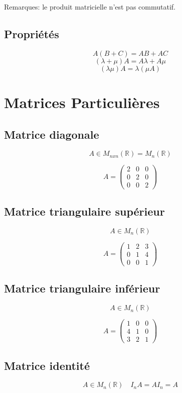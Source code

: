 \documentclass{article}
\begin{document}
Remarques: le produit matricielle n'est pas commutatif.

\subsection{Propriétés}
\[A( B + C ) = AB + AC\]
\[(\lambda + \mu) A = A \lambda + A \mu\]
\[(\lambda \mu) A = \lambda (\mu A)\]

\section{Matrices Particulières}
\subsection{Matrice diagonale}
\[A \in M_{nxn}(\mathbb{R}) = M_{n}(\mathbb{R})\]

\[
A=
  \begin{pmatrix}
    2 & 0 & 0 \\
    0 & 2 & 0 \\
    0 & 0 & 2
  \end{pmatrix}
\]

\subsection{Matrice triangulaire supérieur}
\[A \in M_{n}(\mathbb{R})\]

\[
A=
  \begin{pmatrix}
    1 & 2 & 3 \\
    0 & 1 & 4 \\
    0 & 0 & 1
  \end{pmatrix}
\]

\subsection{Matrice triangulaire inférieur}
\[A \in M_{n}(\mathbb{R})\]

\[
A=
  \begin{pmatrix}
    1 & 0 & 0 \\
    4 & 1 & 0 \\
    3 & 2 & 1
  \end{pmatrix}
\]

\subsection{Matrice identité}
\[A \in M_{n}(\mathbb{R}) \quad I_n A = A I_n = A\]
\end{document}
